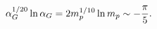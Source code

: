 \begin{equation}
 \alpha_G^{1/20}\ln{\alpha_G} = 2 m_p^{1/10}\ln{m_p}
                     \sim -{\pi\over 5}.
 \label{eq:25}
 \end{equation}

